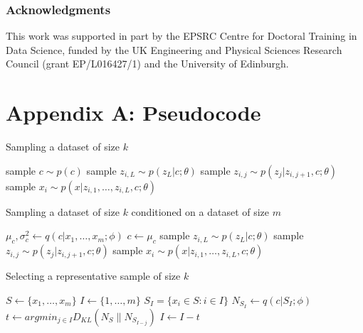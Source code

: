 \documentclass{article} %
\newcommand{\KL}[2]{D_{KL} \left (#1 \| #2 \right )}
\begin{document}
\subsubsection*{Acknowledgments}
This work was supported in part by the EPSRC Centre for Doctoral Training in Data Science, funded by the UK Engineering and Physical Sciences Research Council (grant EP/L016427/1) and the University of Edinburgh.



\appendix
\section{Appendix A: Pseudocode}
\label{appendix_pseudocode}
\begin{algorithm}[H]
    \caption{Sampling a dataset of size $k$}
    \label{alg:sampling}
    \begin{algorithmic}
        \STATE sample $c \sim p(c)$
            \STATE sample $z_{i,L} \sim p(z_{L} |c; \theta)$
               \STATE sample $z_{i,j} \sim p(z_{j} | z_{i,j+1},c; \theta)$
            \ENDFOR
            \STATE sample $x_{i} \sim p( x | z_{i,1}, \dots, z_{i,L}, c; \theta)$
        \ENDFOR
    \end{algorithmic}
\end{algorithm}
    \begin{algorithm}[H]
    \caption{Sampling a dataset of size $k$ conditioned on a dataset of size $m$} 
    \label{alg:cond_sampling}
    \begin{algorithmic}
        \STATE $\mu_c, \sigma^2_c \gets q(c | x_1, \dots, x_m ; \phi)$ 
        \STATE $c \gets \mu_c$ 
            \STATE sample $z_{i,L} \sim p(z_{L} |c;\theta)$
               \STATE sample $z_{i,j} \sim p(z_{j} | z_{i,j+1},c; \theta)$
            \ENDFOR
            \STATE sample $x_{i} \sim p( x | z_{i,1}, \dots, z_{i,L}, c; \theta)$
        \ENDFOR
    \end{algorithmic}
\end{algorithm}
    \begin{algorithm}[H]
    \caption{Selecting a representative sample of size $k$} 
    \label{alg:subsample}
    \begin{algorithmic}
        \STATE $S \gets \{x_1, \dots, x_m\}$
        \STATE $I \gets \{1, \dots, m \}$
        \STATE $S_I = \{x_i \in S : i \in I  \}$
        \STATE $N_{S_I} \gets q(c | S_I ; \phi)$ 
            \STATE $t \gets argmin_{j \in I} \KL{N_S}{N_{S_{I - j}}}$
            \STATE $I \gets I - t$

        \ENDFOR
    \end{algorithmic}
\end{algorithm}
\end{document}
